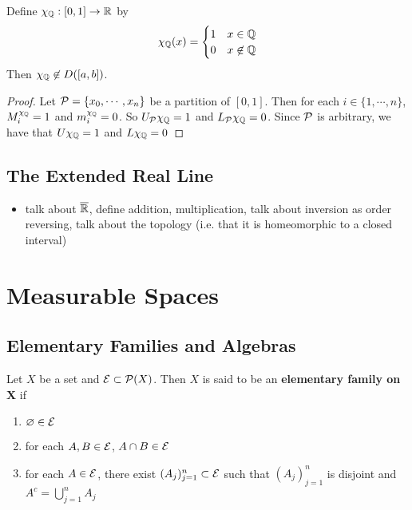 \documentclass{book}
\begin{document}
	\begin{ex}  
		Define $\chi_{\mathbb{Q}}:[0,1] \rightarrow \mathbb{R}$ by $$\chi_{\mathbb{Q}}(x) = \begin{cases}
			1 & x \in \mathbb{Q} \\
			0 & x \not \in \mathbb{Q}
		\end{cases}$$
		Then $\chi_{\mathbb{Q}} \not \in D([a,b])$.
	\end{ex}

	\begin{proof}
		Let $\mathcal{P} = \{x_0, \cdots, x_n\}$ be a partition of $[0,1]$. Then for each $i \in \{1, \cdots, n\}$, $M^{\chi_{\mathbb{Q}}}_i = 1$ and $m^{\chi_{\mathbb{Q}}}_i = 0$. So $U_{\mathcal{P}} \chi_{\mathbb{Q}} = 1$ and $L_{\mathcal{P}} \chi_{\mathbb{Q}} = 0$. Since $\mathcal{P}$ is arbitrary, we have that $U \chi_{\mathbb{Q}} = 1$ and $L \chi_{\mathbb{Q}} = 0$
	\end{proof}

	
	
	\newpage
	\section{The Extended Real Line}
	
	\begin{itemize}
		\item talk about $\overline{\mathbb{R}}$, define addition, multiplication, talk about inversion as order reversing, talk about the topology (i.e. that it is homeomorphic to a closed interval)
	\end{itemize}
	
	
	
	
	
	
	
	
	
	
	\newpage
	
	\chapter{Measurable Spaces}
	
	
	\section{Elementary Families and Algebras}
	
	\begin{defn}  
		Let $X$ be a set and $\mathcal{E} \subset \mathcal{P}(X)$. Then $X$ is said to be an \textbf{elementary family on X} if 
		\begin{enumerate}
			\item $\varnothing \in \mathcal{E}$
			\item for each $A, B \in \mathcal{E}$, $A \cap B \in \mathcal{E}$
			\item for each $A \in \mathcal{E}$, there exist $(A_j)_{j=1}^n \subset \mathcal{E}$ such that  $(A_j)_{j=1}^n $ is disjoint and $A^c = \bigcup\limits_{j=1}^n A_j$
		\end{enumerate}
	\end{defn}
	
\end{document}
